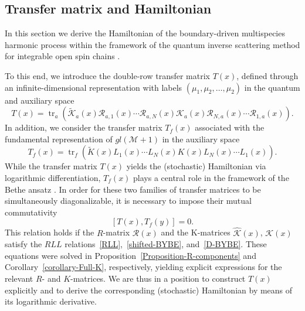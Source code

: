 \documentclass[11pt]{article}
\numberwithin{equation}{section}
\newcommand{\eR}{\mathcal{R}}
\newcommand{\KhatFull}{\mathcal{K}}
\newcommand{\Kfull}{\widetilde{\mathcal{K}}}
\newcommand{\KhatFundFull}{K}
\newcommand{\KFundFull}{\widetilde{K}}
\DeclareMathOperator{\tr}{\text{tr}}
\begin{document}
\subsection{Transfer matrix and Hamiltonian}\label{Section-transfer-matrix}

In this section we derive the Hamiltonian of the boundary-driven multispecies harmonic process within the framework of the quantum inverse scattering method for integrable open spin chains \cite{Sklyanin:1988yz}.


To this end, we introduce the double-row transfer matrix $T(x)$, defined through an infinite-dimensional representation with labels $(\mu_{1},\mu_{2},\ldots,\mu_{2})$ in the quantum and auxiliary space
\begin{equation}
T(x)=\tr_{a}\!\left(
\Kfull_{a}(x)
\eR_{a,1}(x)\cdots \eR_{a,N}(x)
\KhatFull_{a}(x)
\eR_{N,a}(x)\cdots \eR_{1,a}(x)
\right).
\end{equation}
In addition, we consider the transfer matrix $T_{f}(x)$ associated with the fundamental representation of $gl(\mathcal{M}+1)$ in the auxiliary space\begin{equation}
T_{f}(x)=\tr_{f}\!\left(
\KFundFull(x)
L_{1}(x)\cdots L_{{N}}(x)
\KhatFundFull(x)
L_{{N}}(x)\cdots L_{1}(x)
\right).
\end{equation}
While the transfer matrix $T(x)$ yields the (stochastic) Hamiltonian via logarithmic differentiation, $T_{f}(x)$ plays a central role in the framework of the Bethe ansatz \cite{Faddeev:1996iy}. In order for these two families of transfer matrices to be simultaneously diagonalizable, it is necessary to impose their mutual commutativity
\begin{equation}
\left[T(x),T_{f}(y)\right]=0.
\end{equation}
This relation holds if the $R$-matrix $\eR(x)$ and the K-matrices $\hat{\mathcal{K}}(x)$, $\mathcal{K}(x)$ satisfy the $RLL$ relations~\eqref{RLL},~\eqref{shifted-BYBE}, and~\eqref{D-BYBE}. These equations were solved in Proposition~\ref{Proposition-R-components} and Corollary~\ref{corollary-Full-K}, respectively, yielding explicit expressions for the relevant $R$- and $K$-matrices. We are thus in a position to construct $T(x)$ explicitly and to derive the corresponding (stochastic) Hamiltonian by means of its logarithmic derivative.
\end{document}
